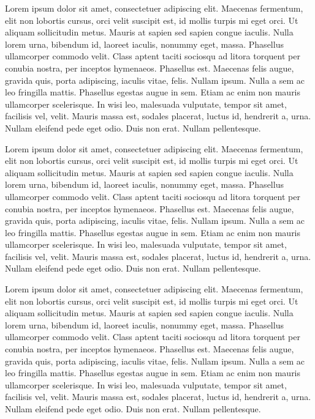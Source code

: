 \documentclass{article}
\begin{document}
Lorem ipsum dolor sit amet, consectetuer adipiscing elit. Maecenas fermentum, elit non lobortis cursus, orci velit suscipit est, id mollis turpis mi eget orci. Ut aliquam sollicitudin metus. Mauris at sapien sed sapien congue iaculis. Nulla lorem urna, bibendum id, laoreet iaculis, nonummy eget, massa. Phasellus ullamcorper commodo velit. Class aptent taciti sociosqu ad litora torquent per conubia nostra, per inceptos hymenaeos. Phasellus est. Maecenas felis augue, gravida quis, porta adipiscing, iaculis vitae, felis. Nullam ipsum. Nulla a sem ac leo fringilla mattis. Phasellus egestas augue in sem. Etiam ac enim non mauris ullamcorper scelerisque. In wisi leo, malesuada vulputate, tempor sit amet, facilisis vel, velit. Mauris massa est, sodales placerat, luctus id, hendrerit a, urna. Nullam eleifend pede eget odio. Duis non erat. Nullam pellentesque.

Lorem ipsum dolor sit amet, consectetuer adipiscing elit. Maecenas fermentum, elit non lobortis cursus, orci velit suscipit est, id mollis turpis mi eget orci. Ut aliquam sollicitudin metus. Mauris at sapien sed sapien congue iaculis. Nulla lorem urna, bibendum id, laoreet iaculis, nonummy eget, massa. Phasellus ullamcorper commodo velit. Class aptent taciti sociosqu ad litora torquent per conubia nostra, per inceptos hymenaeos. Phasellus est. Maecenas felis augue, gravida quis, porta adipiscing, iaculis vitae, felis. Nullam ipsum. Nulla a sem ac leo fringilla mattis. Phasellus egestas augue in sem. Etiam ac enim non mauris ullamcorper scelerisque. In wisi leo, malesuada vulputate, tempor sit amet, facilisis vel, velit. Mauris massa est, sodales placerat, luctus id, hendrerit a, urna. Nullam eleifend pede eget odio. Duis non erat. Nullam pellentesque.

Lorem ipsum dolor sit amet, consectetuer adipiscing elit. Maecenas fermentum, elit non lobortis cursus, orci velit suscipit est, id mollis turpis mi eget orci. Ut aliquam sollicitudin metus. Mauris at sapien sed sapien congue iaculis. Nulla lorem urna, bibendum id, laoreet iaculis, nonummy eget, massa. Phasellus ullamcorper commodo velit. Class aptent taciti sociosqu ad litora torquent per conubia nostra, per inceptos hymenaeos. Phasellus est. Maecenas felis augue, gravida quis, porta adipiscing, iaculis vitae, felis. Nullam ipsum. Nulla a sem ac leo fringilla mattis. Phasellus egestas augue in sem. Etiam ac enim non mauris ullamcorper scelerisque. In wisi leo, malesuada vulputate, tempor sit amet, facilisis vel, velit. Mauris massa est, sodales placerat, luctus id, hendrerit a, urna. Nullam eleifend pede eget odio. Duis non erat. Nullam pellentesque.
\end{document}
